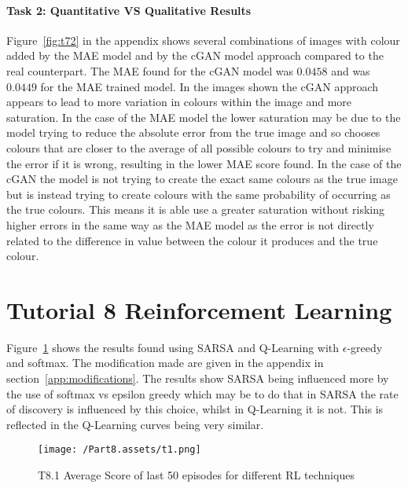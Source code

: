 \documentclass[10pt,twocolumn,letterpaper]{article}
\begin{document}
\paragraph{Task 2: Quantitative VS Qualitative Results}

Figure~\ref*{fig:t72} in the appendix shows several combinations of images with colour added by the MAE model and by the cGAN model approach compared to the real counterpart. The MAE found for the cGAN model was $0.0458$ and was $0.0449$ for the MAE trained model. In the images shown the cGAN approach appears to lead to more variation in colours within the image and more saturation. In the case of the MAE model the lower saturation may be due to the model trying to reduce the absolute error from the true image and so chooses colours that are closer to the average of all possible colours to try and minimise the error if it is wrong, resulting in the lower MAE score found. In the case of the cGAN the model is not trying to create the exact same colours as the true image but is instead trying to create colours with the same probability of occurring as the true colours\cite{gan}. This means it is able use a greater saturation without risking higher errors in the same way as the MAE model as the error is not directly related to the difference in value between the colour it produces and the true colour.

\section{Tutorial 8 Reinforcement Learning}

Figure~\ref*{fig:t81} shows the results found using SARSA and Q-Learning with $\epsilon$-greedy and softmax. The modification made are given in the appendix in section~\ref*{app:modifications}. The results show SARSA being influenced more by the use of softmax vs epsilon greedy which may be to do that in SARSA the rate of discovery is influenced by this choice, whilst in Q-Learning it is not. This is reflected in the Q-Learning curves being very similar.
\vspace{-0.2cm}
\begin{figure}[ht]
    \begin{center}
        \texttt{[image: /Part8.assets/t1.png]}
        \caption{T8.1 Average Score of last 50 episodes for different RL techniques}\label{fig:t81}
    \end{center}
\end{figure}
\end{document}
